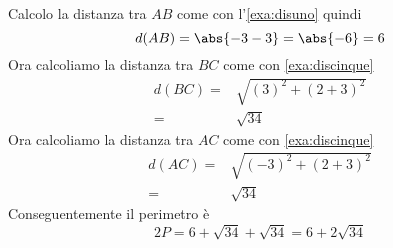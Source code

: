 Calcolo la distanza tra $AB$ come con l'\cref{exa:disuno}
quindi \[d(AB)=\abs{-3-3}=\abs{-6}=6\] Ora calcoliamo la distanza tra $BC$ come con \cref{exa:discinque}
\begin{align*}
d(BC)=&\sqrt{(3)^2+(2+3)^2}\\
=&\sqrt{34}
\end{align*}
Ora calcoliamo la distanza tra $AC$ come con \cref{exa:discinque}
\begin{align*}
d(AC)=&\sqrt{(-3)^2+(2+3)^2}\\
=&\sqrt{34}
\end{align*}
Conseguentemente il perimetro è
\[2P=6+\sqrt{34}+\sqrt{34}=6+2\sqrt{34}\]
\begin{center}
	
	\label{fig:EsRieDistanza11}
\end{center}

